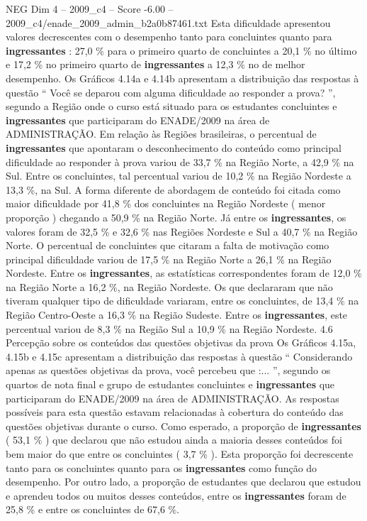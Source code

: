 \begin{textsample}{NEG Dim 4 – 2009\_c4 – Score -6.00 – 2009\_c4/enade\_2009\_admin\_b2a0b87461.txt}
Esta dificuldade apresentou valores decrescentes com o desempenho tanto para concluintes quanto para \textbf{ingressantes} : 27,0 \% para o primeiro quarto de concluintes a 20,1 \% no último e 17,2 \% no primeiro quarto de \textbf{ingressantes} a 12,3 \% no de melhor desempenho.
Os Gráficos 4.14a e 4.14b apresentam a distribuição das respostas à questão “ Você se deparou com alguma dificuldade ao responder a prova? ”, segundo a Região onde o curso está situado para os estudantes concluintes e \textbf{ingressantes} que participaram do ENADE/2009 na área de ADMINISTRAÇÃO.
Em relação às Regiões brasileiras, o percentual de \textbf{ingressantes} que apontaram o desconhecimento do conteúdo como principal dificuldade ao responder à prova variou de 33,7 \% na Região Norte, a 42,9 \% na Sul.
Entre os concluintes, tal percentual variou de 10,2 \% na Região Nordeste a 13,3 \%, na Sul.
A forma diferente de abordagem de conteúdo foi citada como maior dificuldade por 41,8 \% dos concluintes na Região Nordeste ( menor proporção ) chegando a 50,9 \% na Região Norte.
Já entre os \textbf{ingressantes}, os valores foram de 32,5 \% e 32,6 \% nas Regiões Nordeste e Sul a 40,7 \% na Região Norte.
O percentual de concluintes que citaram a falta de motivação como principal dificuldade variou de 17,5 \% na Região Norte a 26,1 \% na Região Nordeste.
Entre os \textbf{ingressantes}, as estatísticas correspondentes foram de 12,0 \% na Região Norte a 16,2 \%, na Região Nordeste.
Os que declararam que não tiveram qualquer tipo de dificuldade variaram, entre os concluintes, de 13,4 \% na Região Centro-Oeste a 16,3 \% na Região Sudeste.
Entre os \textbf{ingressantes}, este percentual variou de 8,3 \% na Região Sul a 10,9 \% na Região Nordeste. 4.6 Percepção sobre os conteúdos das questões objetivas da prova Os Gráficos 4.15a, 4.15b e 4.15c apresentam a distribuição das respostas à questão “ Considerando apenas as questões objetivas da prova, você percebeu que :... ”, segundo os quartos de nota final e grupo de estudantes concluintes e \textbf{ingressantes} que participaram do ENADE/2009 na área de ADMINISTRAÇÃO.
As respostas possíveis para esta questão estavam relacionadas à cobertura do conteúdo das questões objetivas durante o curso.
Como esperado, a proporção de \textbf{ingressantes} ( 53,1 \% ) que declarou que não estudou ainda a maioria desses conteúdos foi bem maior do que entre os concluintes ( 3,7 \% ).
Esta proporção foi decrescente tanto para os concluintes quanto para os \textbf{ingressantes} como função do desempenho.
Por outro lado, a proporção de estudantes que declarou que estudou e aprendeu todos ou muitos desses conteúdos, entre os \textbf{ingressantes} foram de 25,8 \% e entre os concluintes de 67,6 \%.

\end{textsample}
